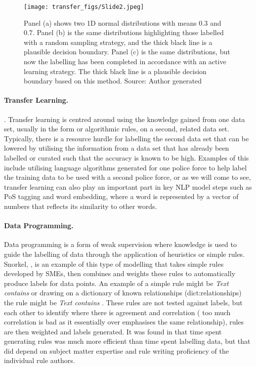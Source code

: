 \begin{figure}
  \texttt{[image: transfer\_figs/Slide2.jpeg]}
  \caption[Pictorial example of active learning strategy.]{ Panel (a) shows two 1D normal distributions with means 0.3 and 0.7. Panel (b) is the same distributions highlighting those labelled with a random sampling strategy, and the thick black line is a plausible decision boundary. Panel (c) is the same distributions, but now the labelling has been completed in accordance with an active learning strategy. The thick black line is a plausible decision boundary based on this method. Source: Author generated}
  \label{fig:active}
\end{figure}

\paragraph{Transfer Learning.}  \parencite{weiss2016survey,}. Transfer learning is centred around using the knowledge gained from one data set, usually in the form or algorithmic rules, on a second, related data set. Typically, there is a resource hurdle for labelling the second data set that can be lowered by utilising the information from a data set that has already been labelled or curated such that the accuracy is known to be high. Examples of this include utilising language algorithms generated for one police force to help label the training data to be used with a second police force, or as we will come to see, transfer learning can also play an important part in key NLP model steps such as PoS tagging and word embedding, where a word is represented by a vector of numbers that reflects its similarity to other words.


\paragraph{Data Programming.}  Data programming is a form of weak supervision where knowledge is used to guide the labelling of data through the application of heuristics or simple rules. Snorkel, \parencite{ratner2017snorkel}, is an example of this type of modelling that takes simple rules developed by SMEs, then combines and weights these rules to automatically produce labels for data points. An example of a simple rule might be \emph{Text contains } or drawing on a dictionary of known relationships (dict:relationships) the rule might be \emph{Text contains }. These rules are not tested against labels, but each other to identify where there is agreement and correlation ( too much correlation is bad as it essentially over emphasises the same relationship), rules are then weighted and labels generated. It was found in \textcite{ratner2017snorkel} that time spent generating rules was much more efficient than time spent labelling data, but that did depend on subject matter expertise and rule writing proficiency of the individual rule authors.


